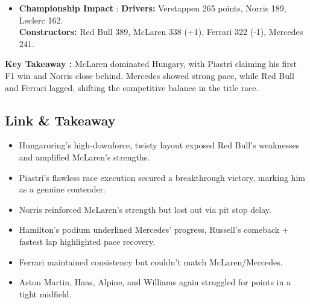 \begin{itemize}
    \item \textbf{Championship Impact} : \textbf{Drivers:} Verstappen 265 points, Norris 189, Leclerc 162.\\
    \textbf{Constructors:} Red Bull 389, McLaren 338 (+1), Ferrari 322 (-1), Mercedes 241.    
\end{itemize}

\textbf{Key Takeaway :}
McLaren dominated Hungary, with Piastri claiming his first F1 win and Norris close behind. Mercedes showed strong pace, while Red Bull and Ferrari lagged, shifting the competitive balance in the title race.


\subsection{Link \& Takeaway}

\begin{itemize}
    \item Hungaroring’s high-downforce, twisty layout exposed Red Bull’s weaknesses and amplified McLaren’s strengths. 
    \item Piastri’s flawless race execution secured a breakthrough victory, marking him as a genuine contender. 
    \item Norris reinforced McLaren’s strength but lost out via pit stop delay. 
    \item Hamilton’s podium underlined Mercedes’ progress, Russell’s comeback + fastest lap highlighted pace recovery. 
    \item Ferrari maintained consistency but couldn’t match McLaren/Mercedes. 
    \item Aston Martin, Haas, Alpine, and Williams again struggled for points in a tight midfield.
\end{itemize}